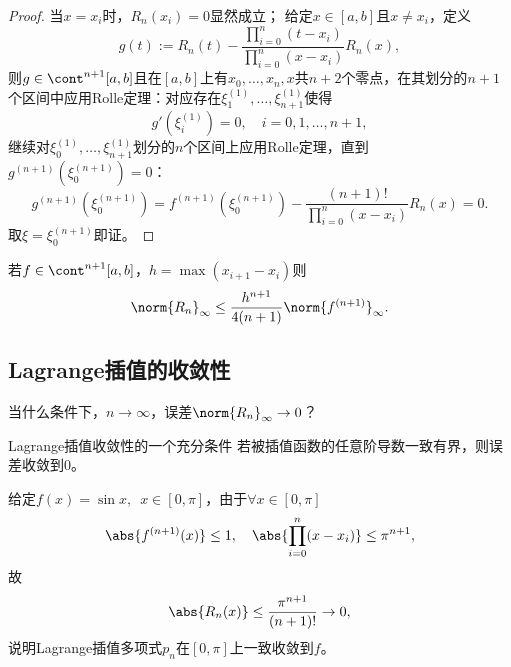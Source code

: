 \begin{proof}
    当$x=x_i$时，$R_n(x_i)=0$显然成立；
    给定$x\in[a,b]$且$x\neq x_i$，定义
    \[
        g(t):=R_n(t)-\frac{\prod_{i=0}^n(t-x_i)}{\prod_{i=0}^n(x-x_i)}R_n(x),
    \]
    则$g\in\cont^{n+1}[a,b]$且在$[a,b]$上有$x_0,\ldots,x_n,x$共$n+2$个零点，在其划分的$n+1$个区间中应用Rolle定理：对应存在$\xi_1^{(1)},\ldots,\xi_{n+1}^{(1)}$使得
    \[
        g'(\xi_i^{(1)})=0,\quad i=0,1,\ldots,n+1,
    \]
    继续对$\xi_0^{(1)},\ldots,\xi_{n+1}^{(1)}$划分的$n$个区间上应用Rolle定理，直到$g^{(n+1)}(\xi^{(n+1)}_0)=0$：
    \[
        g^{(n+1)}(\xi^{(n+1)}_0)=f^{(n+1)}(\xi^{(n+1)}_0)-\frac{(n+1)!}{\prod_{i=0}^n(x-x_i)}R_n(x)=0.
    \]
    取$\xi=\xi_0^{(n+1)}$即证。
\end{proof}

\begin{corollary}
    若$f\in\cont^{n+1}[a,b]$，$h=\max(x_{i+1}-x_i)$则
    \begin{equation}
        \norm{R_n}_\infty\leq\frac{h^{n+1}}{4(n+1)}\norm{f^{(n+1)}}_\infty.
    \end{equation}
\end{corollary}

\subsection{Lagrange插值的收敛性}

当什么条件下，$n\to\infty$，误差$\norm{R_n}_\infty\to 0$？

\begin{theorem}
    {Lagrange插值收敛性的一个充分条件}{}
    若被插值函数的任意阶导数一致有界，则误差收敛到0。
\end{theorem}

\begin{example}
    {}{}
    给定$f(x)=\sin x,\enspace x\in[0,\pi]$，由于$\forall x\in[0,\pi]$
    \[
        \abs{f^{(n+1)}(x)}\leq 1,\quad\abs{\prod_{i=0}^n(x-x_i)}\leq\pi^{n+1},
    \]
    故
    \[
        \abs{R_n(x)}\leq\frac{\pi^{n+1}}{(n+1)!}\to0,
    \]
    说明Lagrange插值多项式$p_n$在$[0,\pi]$上一致收敛到$f$。
\end{example}



